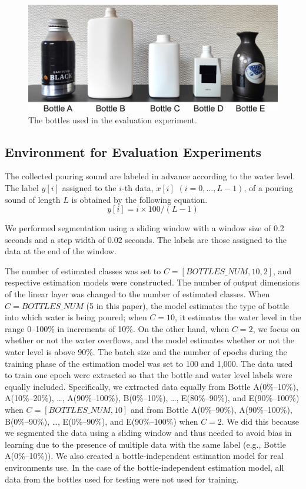 \documentclass[sigconf]{acmart}
\begin{document}
\begin{figure}[!t]
  \centering
  \includegraphics[width=1\linewidth]{figures/bottles.eps}
  \caption{The bottles used in the evaluation experiment.}
  \label{fig:bottles}
\end{figure}


\subsection{Environment for Evaluation Experiments}
The collected pouring sound are labeled in advance according to the water level. The label $y[i]$ assigned to the $i$-th data, $x[i]$ $(i=0,\dots,L-1)$, of a pouring sound of length $L$ is obtained by the following equation.
\begin{equation}
  y[i]=i \times 100/(L-1)
\end{equation}

We performed segmentation using a sliding window with a window size of 0.2 seconds and a step width of 0.02 seconds. The labels are those assigned to the data at the end of the window.\par

The number of estimated classes was set to $C=[BOTTLES\_NUM,10,2]$, and respective estimation models were constructed. The number of output dimensions of the linear layer was changed to the number of estimated classes. When $C=BOTTLES\_NUM$ (5 in this paper), the model estimates the type of bottle into which water is being poured; when $C=10$, it estimates the water level in the range 0--100\% in increments of 10\%. On the other hand, when $C=2$, we focus on whether or not the water overflows, and the model estimates whether or not the water level is above 90\%. The batch size and the number of epochs during the training phase of the estimation model was set to 100 and 1,000. The data used to train one epoch were extracted so that the bottle and water level labels were equally included. Specifically, we extracted data equally from Bottle A(0\%--10\%), A(10\%--20\%), \dots, A(90\%--100\%), B(0\%--10\%), \dots, E(80\%--90\%), and E(90\%--100\%) when $C=[BOTTLES\_NUM,10]$ and from Bottle A(0\%--90\%), A(90\%--100\%), B(0\%--90\%), \dots, E(0\%--90\%), and E(90\%--100\%) when $C=2$. We did this because we segmented the data using a sliding window and thus needed to avoid bias in learning due to the presence of multiple data with the same label (e.g., Bottle A(0\%--10\%)). We also created a bottle-independent estimation model for real environments use. In the case of the bottle-independent estimation model, all data from the bottles used for testing were not used for training.
\end{document}
